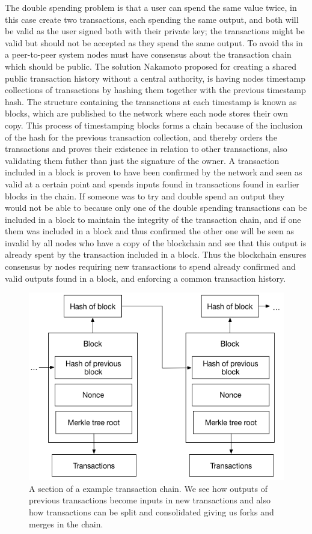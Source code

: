 The double spending problem is that a user can spend the same value twice, in this case create two transactions, each spending the same output, and both will be valid as the user signed both with their private key; the transactions might be valid but should not be accepted as they spend the same output. To avoid ths in a peer-to-peer system nodes must have consensus about the transaction chain which should be public. The solution Nakamoto \cite{nakamoto2008bitcoin} proposed for creating a shared public transaction history without a central authority, is having nodes timestamp collections of transactions by hashing them together with the previous timestamp hash. 
 The structure containing the transactions at each timestamp is known as blocks, which are published to the network where each node stores their own copy. 
This process of timestamping blocks forms a chain because of the inclusion of the hash for the previous transaction collection, and thereby orders the transactions and proves their existence in relation to other transactions, also validating them futher than just the signature of the owner. A transaction included in a block is proven to have been confirmed by the network and seen as valid at a certain point and spends inputs found in transactions found in earlier blocks in the chain. If someone was to try and double spend an output they would not be able to because only one of the double spending transactions can be included in a block to maintain the integrity of the transaction chain, and if one them was included in a block and thus confirmed the other one will be seen as invalid by all nodes who have a copy of the blockchain and see that this output is already spent by the transaction included in a block. Thus the blockchain ensures consensus by nodes requiring new transactions to spend already confirmed and valid outputs found in a block, and enforcing a common transaction history.

\begin{figure}[h]  %
  \centering
  \includegraphics[width=.7\textwidth]{figures/blockchain}
  \caption[Transaction chain]{A section of a example transaction chain. We see how outputs of previous transactions become inputs in new transactions and also how transactions can be split and consolidated giving us forks and merges in the chain.}
  \label{fig:blockchain}
\end{figure}

